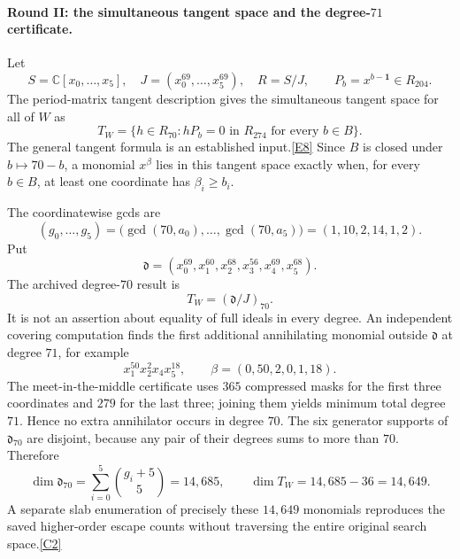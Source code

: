 \documentclass[11pt]{article}
\newcommand{\C}{\mathbb C}
\newcommand{\src}[1]{\hyperlink{src:#1}{[#1]}}
\begin{document}
\paragraph{Round II: the simultaneous tangent space and the degree-$71$ certificate.}
Let
\[
 S=\C[x_0,\ldots,x_5],\quad
 J=(x_0^{69},\ldots,x_5^{69}),\quad R=S/J,
 \qquad P_b=x^{b-\mathbf1}\in R_{204}.
\]
The period-matrix tangent description gives the simultaneous tangent space
for all of $W$ as
\begin{equation}\label{hodge:tangent}
 T_W=\{h\in R_{70}:hP_b=0\text{ in }R_{274}\text{ for every }b\in B\}.
\end{equation}
The general tangent formula is an established input.\src{E8}
Since $B$ is closed under $b\mapsto70-b$, a monomial $x^\beta$ lies in this
tangent space exactly when, for every $b\in B$, at least one coordinate has
$\beta_i\ge b_i$.

The coordinatewise gcds are
\[
 (g_0,\ldots,g_5)
 =\bigl(\gcd(70,a_0),\ldots,\gcd(70,a_5)\bigr)
 =(1,10,2,14,1,2).
\]
Put
\[
 \mathfrak d=(x_0^{69},x_1^{60},x_2^{68},x_3^{56},x_4^{69},x_5^{68}).
\]
The archived degree-$70$ result is
\begin{equation}\label{hodge:tangent-ideal}
 T_W=(\mathfrak d/J)_{70}.
\end{equation}
It is not an assertion about equality of full ideals in every degree. An
independent covering computation finds the first additional annihilating
monomial outside $\mathfrak d$ at degree $71$, for example
\[
 x_1^{50}x_2^2x_4x_5^{18},\qquad
 \beta=(0,50,2,0,1,18).
\]
The meet-in-the-middle certificate uses $365$ compressed masks for the first
three coordinates and $279$ for the last three; joining them yields minimum
total degree $71$. Hence no extra annihilator occurs in degree $70$.
The six generator supports of $\mathfrak d_{70}$ are disjoint, because any
pair of their degrees sums to more than $70$. Therefore
\begin{equation}\label{hodge:tangent-dim}
 \dim\mathfrak d_{70}=\sum_{i=0}^{5}\binom{g_i+5}{5}=14,685,
 \qquad \dim T_W=14,685-36=14,649.
\end{equation}
A separate slab enumeration of precisely these $14,649$ monomials reproduces
the saved higher-order escape counts without traversing the entire original
search space.\src{C2}
\end{document}
